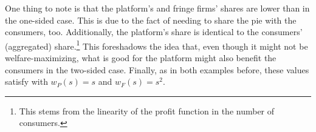 One thing to note is that the platform's and fringe firms' shares are lower than in the one-sided case.
This is due to the fact of needing to share the pie with the consumers, too.
Additionally, the platform's share is identical to the consumers' (aggregated) share.\footnote{
    This stems from the linearity of the profit function in the number of consumers.
}
This foreshadows the idea that, even though it might not be welfare-maximizing, what is good for the platform might also benefit the consumers in the two-sided case.
Finally, as in both examples before, these values satisfy  with $w_P(s) = s$ and $w_F(s) = s^2$.
